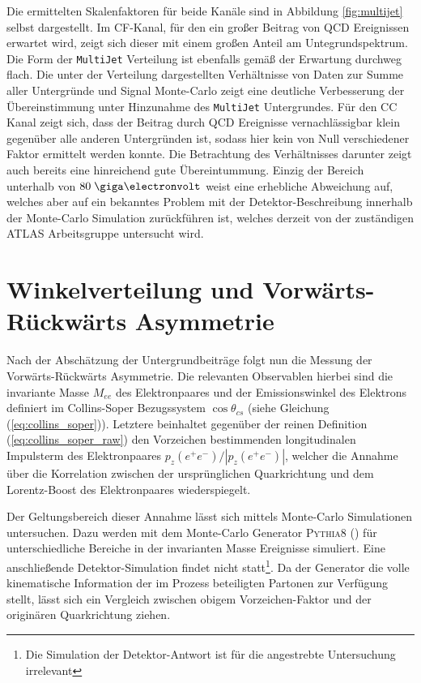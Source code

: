 Die ermittelten Skalenfaktoren für beide Kanäle sind in Abbildung
\ref{fig:multijet} selbst dargestellt. Im \ac{CF}-Kanal, für den ein großer
Beitrag von \ac{QCD} Ereignissen erwartet wird, zeigt sich dieser mit einem
großen Anteil am Untegrundspektrum. Die Form der \texttt{MultiJet} Verteilung
ist ebenfalls gemäß der Erwartung durchweg flach. Die unter der Verteilung
dargestellten Verhältnisse von Daten zur Summe aller Untergründe und
Signal Monte-Carlo zeigt eine deutliche Verbesserung der Übereinstimmung unter
Hinzunahme des \texttt{MultiJet} Untergrundes. Für den \ac{CC} Kanal zeigt
sich, dass der Beitrag durch \ac{QCD} Ereignisse vernachlässigbar klein
gegenüber alle anderen Untergründen ist, sodass hier kein von Null
verschiedener Faktor ermittelt werden konnte. Die Betrachtung des Verhältnisses
darunter zeigt auch bereits eine hinreichend gute Übereintummung.  Einzig der
Bereich unterhalb von $80\GeV$ weist eine erhebliche Abweichung auf, welches
aber auf ein bekanntes Problem mit der Detektor-Beschreibung innerhalb der
Monte-Carlo Simulation zurückführen ist, welches derzeit von der zuständigen
ATLAS Arbeitsgruppe untersucht wird.



\section{Winkelverteilung und Vorwärts-Rückwärts Asymmetrie}
\label{afb:afb}


Nach der Abschätzung der Untergrundbeiträge folgt nun die Messung der
Vorwärts-Rückwärts Asymmetrie. Die relevanten Observablen hierbei sind die
invariante Masse $M_{ee}$ des Elektronpaares und der Emissionswinkel des
Elektrons definiert im Collins-Soper Bezugssystem $\cos\theta_{cs}$ (siehe
Gleichung (\ref{eq:collins_soper})). Letztere beinhaltet gegenüber der reinen
Definition (\ref{eq:collins_soper_raw}) den Vorzeichen bestimmenden
longitudinalen Impulsterm des Elektronpaares $p_z(e^+e^-)/|p_z(e^+e^-)|$,
welcher die Annahme über die Korrelation zwischen der ursprünglichen
Quarkrichtung und dem Lorentz-Boost des Elektronpaares wiederspiegelt. 

Der Geltungsbereich dieser Annahme lässt sich mittels Monte-Carlo Simulationen
untersuchen. Dazu werden mit dem Monte-Carlo Generator \textsc{Pythia8}
(\cite{Sjostrand:2007gs}) für unterschiedliche Bereiche in der invarianten
Masse Ereignisse simuliert. Eine anschließende Detektor-Simulation findet nicht
statt\footnote{Die Simulation der Detektor-Antwort ist für die angestrebte
Untersuchung irrelevant}. Da der Generator die volle kinematische Information
der im Prozess beteiligten Partonen zur Verfügung stellt, lässt sich ein
Vergleich zwischen obigem Vorzeichen-Faktor und der originären Quarkrichtung
ziehen.

